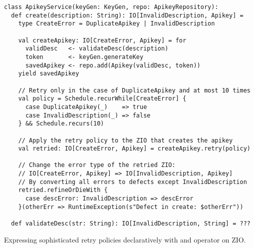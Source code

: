 \begin{algorithm}

\begin{verbatim}
class ApikeyService(keyGen: KeyGen, repo: ApikeyRepository):
  def create(description: String): IO[InvalidDescription, Apikey] =
    type CreateError = DuplicateApikey | InvalidDescription

    val createApikey: IO[CreateError, Apikey] = for
      validDesc   <- validateDesc(description)
      token       <- keyGen.generateKey
      savedApikey <- repo.add(Apikey(validDesc, token))
    yield savedApikey

    // Retry only in the case of DuplicateApikey and at most 10 times
    val policy = Schedule.recurWhile[CreateError] {
      case DuplicateApikey(_)    => true
      case InvalidDescription(_) => false
    } && Schedule.recurs(10)

    // Apply the retry policy to the ZIO that creates the apikey
    val retried: IO[CreateError, Apikey] = createApikey.retry(policy)

    // Change the error type of the retried ZIO:
    // IO[CreateError, Apikey] => IO[InvalidDescription, Apikey]
    // By converting all errors to defects except InvalidDescription
    retried.refineOrDieWith {
      case descError: InvalidDescription => descError
    }(otherErr => RuntimeException(s"Defect in create: $otherErr"))

  def validateDesc(str: String): IO[InvalidDescription, String] = ???
\end{verbatim}

\caption{Expressing sophisticated retry policies declaratively with  and  operator on ZIO. \label{casestudy:retries}}
\end{algorithm}
